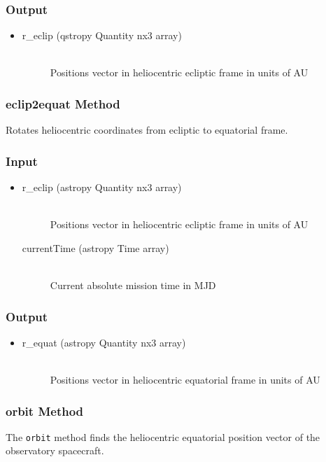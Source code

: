 \documentclass[cleanfoot]{asme2ej}
\begin{document}
\subsubsection*{Output}
\begin{itemize}
\item
\begin{description}
    \item[r\_eclip (qstropy Quantity nx3 array)] \hfill \\ Positions vector in heliocentric ecliptic frame in units of AU
\end{description}
\end{itemize}

\subsubsection{eclip2equat Method} \label{sec:eclip2equat}
Rotates heliocentric coordinates from ecliptic to equatorial frame.
\subsubsection*{Input}
\begin{itemize}
\item
\begin{description}
    \item[r\_eclip (astropy Quantity nx3 array)] \hfill \\ Positions vector in heliocentric ecliptic frame in units of AU
    \item[currentTime (astropy Time array)] \hfill \\ Current absolute mission time in MJD
\end{description}
\end{itemize}
\subsubsection*{Output}
\begin{itemize}
\item
\begin{description}
    \item[r\_equat (astropy Quantity nx3 array)] \hfill \\ Positions vector in heliocentric equatorial frame in units of AU
\end{description}
\end{itemize}

\subsubsection{orbit Method} \label{sec:orbittask}
The \verb+orbit+ method finds the heliocentric equatorial position vector of the observatory spacecraft.
\end{document}
